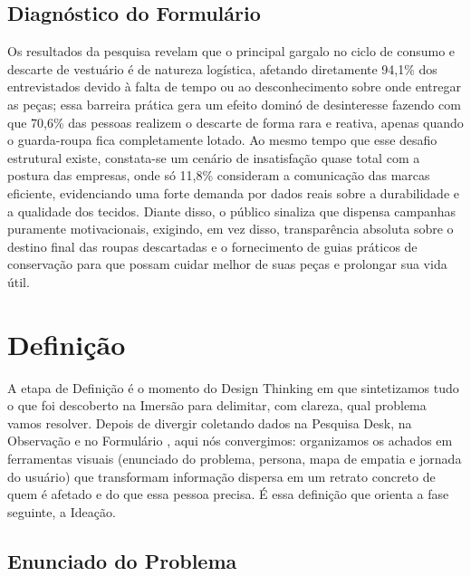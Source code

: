 \documentclass[12pt, a4paper]{article}
\newcommand{\novaSecao}[1]{\clearpage\vspace*{2.2cm}\section{#1}}
\newif\ifmostrarcorrecoes
\newcommand{\correcao}[1]{%
  \ifmostrarcorrecoes
    \par\vspace{6pt}\noindent
    \setlength{\fboxsep}{9pt}%
    \fcolorbox{corCorrecao}{corCorrecaoBg}{%
      \begin{minipage}{\dimexpr\linewidth-2\fboxsep-2\fboxrule\relax}
        {\sffamily\bfseries\footnotesize\color{corCorrecao}\textsf{CORREÇÃO \textemdash{} PROFA. SAMARA}}\par\vspace{3pt}
        {\normalfont\small\color{corCorrecao} #1}
      \end{minipage}}%
    \par\vspace{6pt}
  \fi
}
\begin{document}
\correcao{Conferir os dados: as Figuras~\ref{fig:graf8} e \ref{fig:graf9} apresentam exatamente a mesma distribuição (66,7\% / 28,6\% / 4,8\%) para perguntas diferentes. Verificar no Google Forms se os números das duas perguntas estão corretos ou se houve duplicação ao transcrever as respostas.}

\subsection*{Diagnóstico do Formulário}
Os resultados da pesquisa revelam que o principal gargalo no ciclo de consumo e descarte de vestuário é de natureza logística, afetando diretamente 94,1\% dos entrevistados devido à falta de tempo ou ao desconhecimento sobre onde entregar as peças; essa barreira prática gera um efeito dominó de desinteresse fazendo com que 70,6\% das pessoas realizem o descarte de forma rara e reativa, apenas quando o guarda-roupa fica completamente lotado. Ao mesmo tempo que esse desafio estrutural existe, constata-se um cenário de insatisfação quase total com a postura das empresas, onde só 11,8\% consideram a comunicação das marcas eficiente, evidenciando uma forte demanda por dados reais sobre a durabilidade e a qualidade dos tecidos. Diante disso, o público sinaliza que dispensa campanhas puramente motivacionais, exigindo, em vez disso, transparência absoluta sobre o destino final das roupas descartadas e o fornecimento de guias práticos de conservação para que possam cuidar melhor de suas peças e prolongar sua vida útil.

\novaSecao{Definição}

A etapa de Definição é o momento do Design Thinking em que sintetizamos tudo o que foi descoberto na Imersão para delimitar, com clareza, qual problema vamos resolver. Depois de divergir \textemdash{} coletando dados na Pesquisa Desk, na Observação e no Formulário \textemdash{}, aqui nós convergimos: organizamos os achados em ferramentas visuais (enunciado do problema, persona, mapa de empatia e jornada do usuário) que transformam informação dispersa em um retrato concreto de quem é afetado e do que essa pessoa precisa. É essa definição que orienta a fase seguinte, a Ideação.

\subsection{Enunciado do Problema}
\end{document}
